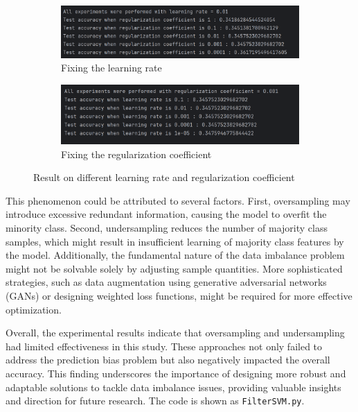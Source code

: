 \documentclass[a4paper, utf8]{ctexart}
\begin{document}
	\begin{figure}[htbp]
		\centering
		\begin{subfigure}{.5\textwidth}
			\centering
			\includegraphics[height=.063\textheight]{./figure/myplotFS12.png}
			\caption{Fixing the learning rate}
		\end{subfigure}
		\begin{subfigure}{.45\textwidth}
			\centering
			\includegraphics[height=.063\textheight]{./figure/myplotFS13.png}
			\caption{Fixing the regularization coefficient}
		\end{subfigure}
		\caption{Result on different learning rate and regularization coefficient}
	\end{figure}
	
	This phenomenon could be attributed to several factors. First, oversampling may introduce excessive redundant information, causing the model to overfit the minority class. Second, undersampling reduces the number of majority class samples, which might result in insufficient learning of majority class features by the model. Additionally, the fundamental nature of the data imbalance problem might not be solvable solely by adjusting sample quantities. More sophisticated strategies, such as data augmentation using generative adversarial networks (GANs) or designing weighted loss functions, might be required for more effective optimization.
	
	Overall, the experimental results indicate that oversampling and undersampling had limited effectiveness in this study. These approaches not only failed to address the prediction bias problem but also negatively impacted the overall accuracy. This finding underscores the importance of designing more robust and adaptable solutions to tackle data imbalance issues, providing valuable insights and direction for future research. The code is shown as \verb|FilterSVM.py|.
	
\end{document}
